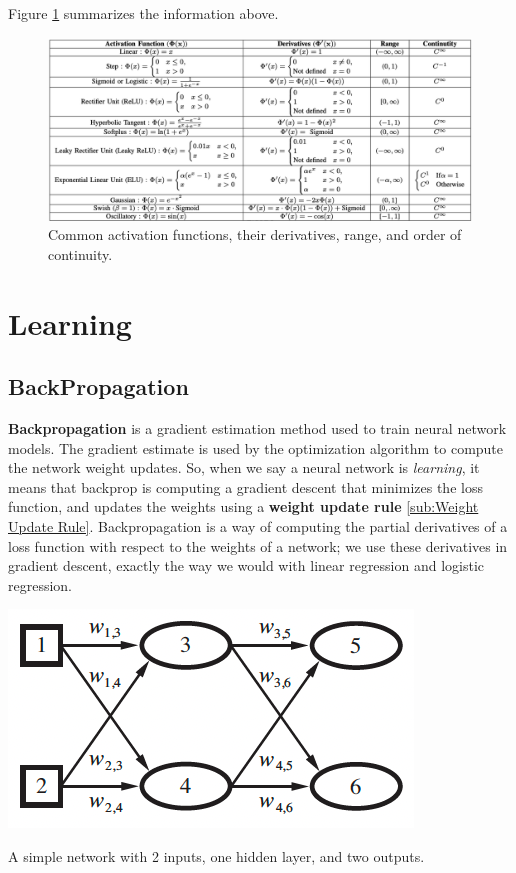 \documentclass[nobib]{tufte-handout} %
\begin{document}
Figure \ref{actfun} summarizes the information above. \begin{figure}\label{actfun}
\includegraphics{ActFunTable}
\caption{Common activation functions, their derivatives, range, and order of continuity.}
\end{figure}

\newpage
\section{Learning}
  \label{sec:Learning}
\subsection{BackPropagation}%
  \label{sub:BackPropagation}
\textbf{Backpropagation} is a gradient estimation method used to train neural network models. The gradient estimate is used by the optimization algorithm to compute the network weight updates. So, when we say a neural network is \textit{learning}, it means that backprop is computing a gradient descent that minimizes the loss function, and updates the weights using a \textbf{weight update rule} \ref{sub:Weight Update Rule}. Backpropagation is a way of computing the partial derivatives of a loss function with respect to the weights of a network; we use these derivatives in gradient descent, exactly the way we would with linear regression and logistic regression. 
\begin{marginfigure}
  \includegraphics{simpleNet}
  \label{simpleNet}
  \caption{A simple network with 2 inputs, one hidden layer, and two outputs.}
\end{marginfigure}
\end{document}
